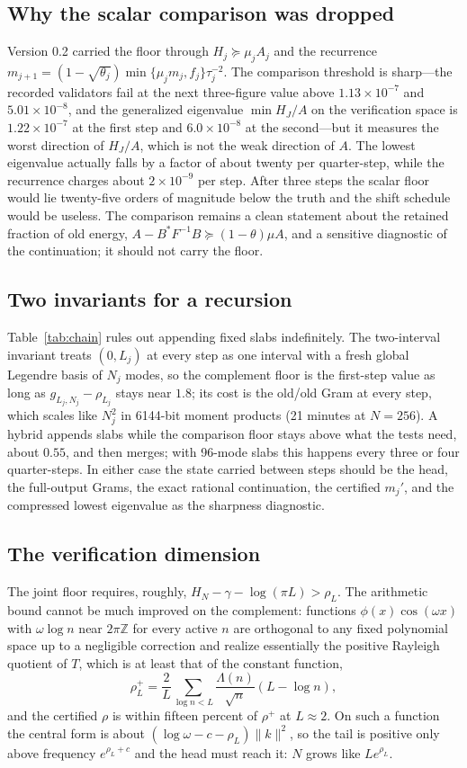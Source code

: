 \documentclass[11pt]{article}
\numberwithin{equation}{section}
\theoremstyle{definition}
\theoremstyle{remark}
\newcommand{\norm}[1]{\lVert#1\rVert}
\newcommand{\MuOne}{1.13\times10^{-7}}                         %
\newcommand{\MuTwo}{5.01\times10^{-8}}                         %
\begin{document}
\subsection{Why the scalar comparison was dropped}
Version 0.2 carried the floor through $H_j\succeq\mu_jA_j$ and the recurrence $m_{j+1}=(1-\sqrt{\theta_j})\allowbreak\min\{\mu_jm_j,f_j\}\tau_j^{-2}$. The comparison threshold is sharp---the recorded validators fail at the next three-figure value above $\MuOne$ and $\MuTwo$, and the generalized eigenvalue $\min H_J/A$ on the verification space is $1.22\times10^{-7}$ at the first step and $6.0\times10^{-8}$ at the second---but it measures the worst direction of $H_J/A$, which is not the weak direction of $A$. The lowest eigenvalue actually falls by a factor of about twenty per quarter-step, while the recurrence charges about $2\times10^{-9}$ per step. After three steps the scalar floor would lie twenty-five orders of magnitude below the truth and the shift schedule would be useless. The comparison remains a clean statement about the retained fraction of old energy, $A-B^*F^{-1}B\succeq(1-\theta)\mu A$, and a sensitive diagnostic of the continuation; it should not carry the floor.

\subsection{Two invariants for a recursion}
Table~\ref{tab:chain} rules out appending fixed slabs indefinitely. The two-interval invariant treats $(0,L_j)$ at every step as one interval with a fresh global Legendre basis of $N_j$ modes, so the complement floor is the first-step value as long as $g_{L_j,N_j}-\rho_{L_j}$ stays near $1.8$; its cost is the old/old Gram at every step, which scales like $N_j^2$ in 6144-bit moment products (21 minutes at $N=256$). A hybrid appends slabs while the comparison floor stays above what the tests need, about $0.55$, and then merges; with 96-mode slabs this happens every three or four quarter-steps. In either case the state carried between steps should be the head, the full-output Grams, the exact rational continuation, the certified $m_j'$, and the compressed lowest eigenvalue as the sharpness diagnostic.

\subsection{The verification dimension}\label{sec:dimension}
The joint floor requires, roughly, $H_N-\gamma-\log(\pi L)>\rho_L$. The arithmetic bound cannot be much improved on the complement: functions $\phi(x)\cos(\omega x)$ with $\omega\log n$ near $2\pi\mathbb Z$ for every active $n$ are orthogonal to any fixed polynomial space up to a negligible correction and realize essentially the positive Rayleigh quotient of $T$, which is at least that of the constant function,
\[
 \rho^+_L=\frac2L\sum_{\log n<L}\frac{\Lambda(n)}{\sqrt n}(L-\log n),
\]
and the certified $\rho$ is within fifteen percent of $\rho^+$ at $L\approx2$. On such a function the central form is about $(\log\omega-c-\rho_L)\norm k^2$, so the tail is positive only above frequency $e^{\rho_L+c}$ and the head must reach it: $N$ grows like $Le^{\rho_L}$.
\end{document}

